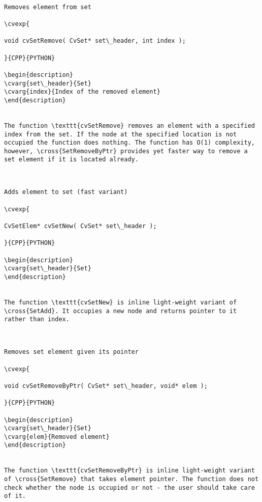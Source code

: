 \label{SetRemove}
\begin{verbatim}

Removes element from set

\cvexp{

void cvSetRemove( CvSet* set\_header, int index );

}{CPP}{PYTHON}

\begin{description}
\cvarg{set\_header}{Set}
\cvarg{index}{Index of the removed element}
\end{description}


The function \texttt{cvSetRemove} removes an element with a specified index from the set. If the node at the specified location is not occupied the function does nothing. The function has O(1) complexity, however, \cross{SetRemoveByPtr} provides yet faster way to remove a set element if it is located already.


\end{verbatim}
\label{SetNew}
\begin{verbatim}

Adds element to set (fast variant)

\cvexp{

CvSetElem* cvSetNew( CvSet* set\_header );

}{CPP}{PYTHON}

\begin{description}
\cvarg{set\_header}{Set}
\end{description}


The function \texttt{cvSetNew} is inline light-weight variant of \cross{SetAdd}. It occupies a new node and returns pointer to it rather than index.


\end{verbatim}
\label{SetRemoveByPtr}
\begin{verbatim}

Removes set element given its pointer

\cvexp{

void cvSetRemoveByPtr( CvSet* set\_header, void* elem );

}{CPP}{PYTHON}

\begin{description}
\cvarg{set\_header}{Set}
\cvarg{elem}{Removed element}
\end{description}


The function \texttt{cvSetRemoveByPtr} is inline light-weight variant of \cross{SetRemove} that takes element pointer. The function does not check whether the node is occupied or not - the user should take care of it.


\end{verbatim}
